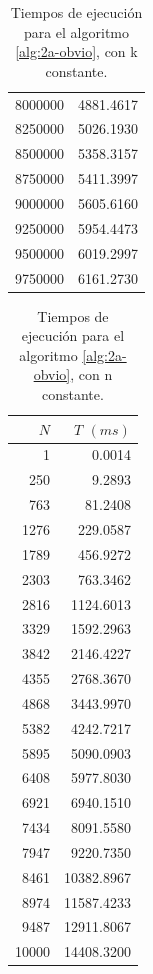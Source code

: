 \begin{table}
\begin{tabular}{|r|r|}
        8000000 & 4881.4617 \\ 
        8250000 & 5026.1930 \\ 
        8500000 & 5358.3157 \\ 
        8750000 & 5411.3997 \\ 
        9000000 & 5605.6160 \\ 
        9250000 & 5954.4473 \\ 
        9500000 & 6019.2997 \\ 
        9750000 & 6161.2730 \\ 
        \hline
    \end{tabular}
    \caption{Tiempos de ejecución para el algoritmo \ref{alg:2a-obvio},
    	con k constante.}
    \label{tab:2a-obvio-n}
\end{table}

\begin{table}
	\footnotesize
	\centering
	\begin{tabular}{|r|r|}
		\hline
		$N$ & $T$ $(ms)$ \\
		\hline
		1 & 0.0014 \\ 
		250 & 9.2893 \\ 
		763 & 81.2408 \\ 
		1276 & 229.0587 \\ 
		1789 & 456.9272 \\ 
		2303 & 763.3462 \\ 
		2816 & 1124.6013 \\ 
		3329 & 1592.2963 \\ 
		3842 & 2146.4227 \\ 
		4355 & 2768.3670 \\ 
		4868 & 3443.9970 \\ 
		5382 & 4242.7217 \\ 
		5895 & 5090.0903 \\ 
		6408 & 5977.8030 \\ 
		6921 & 6940.1510 \\ 
		7434 & 8091.5580 \\ 
		7947 & 9220.7350 \\ 
		8461 & 10382.8967 \\ 
		8974 & 11587.4233 \\ 
		9487 & 12911.8067 \\ 
		10000 & 14408.3200 \\ 
		\hline
	\end{tabular}
	\caption{Tiempos de ejecución para el algoritmo 
		\ref{alg:2a-obvio}, con n constante.}
	\label{tab:2a-obvio-k}
\end{table}

